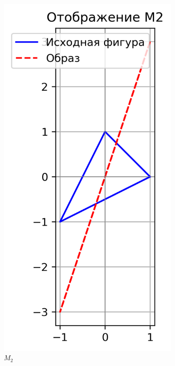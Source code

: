 \begin{figure}[H]
\begin{subfigure}[b]{0.3\textwidth}
    \includegraphics[width=\linewidth]{plots/M2.png}
    \caption{$M_2$}
  \end{subfigure}\hfill
  \begin{subfigure}[b]{0.3\textwidth}

\end{subfigure}
\end{figure}

